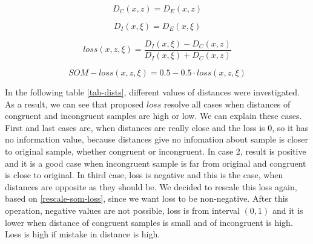 \begin{equation}
    D_C(x, z) = D_E(x, z) 
    \label{eq-dist3}
\end{equation}

\begin{equation}
    D_I(x, \xi) = D_E(x, \xi) 
    \label{eq-dist4}
\end{equation}

\begin{equation}
    \text{$loss(x, z, \xi)$} = \frac{D_I(x, \xi) - D_C(x, z)}{D_I(x, \xi) + D_C(x, z)}
    \label{eq-som-loss}
\end{equation}

\begin{equation}
    \text{$SOM-loss(x, z, \xi)$} = 0.5  - 0.5 \cdot \text{$loss(x, z, \xi)$}
    \label{rescale-som-loss}
\end{equation}

\bigskip

In the following table \ref{tab-dists}, different values of distances were investigated. As a result, we can see that proposed $loss$ resolve all cases when distances of congruent and incongruent samples are high or low.
We can explain these cases. First and last cases are, when distances are really close and the loss is 0, so it has no information value, because distances give no infomation about sample is closer to original sample, whether congruent or incongruent. In case 2, result is positive and it is a good case when incongruent sample is far from original and congruent is close to original. In third case, loss is negative and this is the case, when distances are opposite as they should be. We decided to rescale this loss again, based on \ref{rescale-som-loss}, since we want loss to be non-negative. After this operation, negative values are not possible, loss is from interval $(0, 1)$ and it is lower when distance of congruent samples is small and of incongruent is high. Loss is high if mistake in distance is high.

\bigskip

